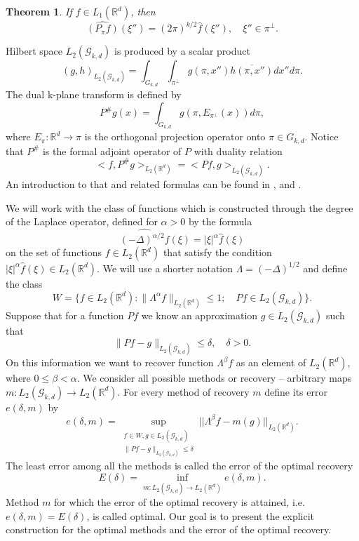 \documentclass[12pt]{iopart}
\newtheorem{theorem}{Theorem}
\begin{document}
	\begin{theorem}
		\label{projection}
		If $f\in L_1(\mathbb R^d)$, then
		$$\widehat{(P_\pi f)}(\xi'')=(2\pi)^{k/2}\widehat f(\xi''),\quad \xi''\in\pi^\perp.$$
	\end{theorem}
	Hilbert space $L_2(\mathcal G_{k,d})$ is produced by a scalar product	
	$$(g,h)_{L_2(\mathcal G_{k,d})}=\int_{G_{k,d}}\int_{\pi^\perp}g(\pi,x'')\overline{h(\pi,x'')}dx''d\pi.$$
	The dual k-plane transform is defined by
	$$P^\#g(x) = \int_{G_{k,d}}g(\pi,E_{\pi^\perp}(x))d\pi,$$
	where $E_\pi:\mathbb R^d\rightarrow\pi$ is the orthogonal projection operator onto $\pi\in G_{k,d}$.
	Notice that $P^\#$ is the formal adjoint operator of $P$ with duality relation
	\begin{equation}
	\label{duality}
	<f,P^\#g>_{L_2(\mathbb R^d)} = <Pf,g>_{L_2(\mathcal G_{k,d})}.
	\end{equation}
	An introduction to that and related formulas can be found in \cite{H},\cite{K} and \cite{MA}.
	
	We will work with the class of functions which is constructed through the degree of the Laplace operator, defined for $\alpha> 0$ by the formula 
	$$\widehat{(-\Delta)^{\alpha/2}f}(\xi)=|\xi|^\alpha \widehat f(\xi)$$ on the set of functions $f\in L_2(\mathbb R^d)$ that satisfy the condition $|\xi|^\alpha\widehat f(\xi)\in L_2(\mathbb R^d)$.
	We will use a shorter notation $\Lambda=(-\Delta)^{1/2}$ and define the class 
	$$ W=\{f\in L_2(\mathbb R^d) :
	\|\Lambda^\alpha f\|_{L_2(\mathbb R^d)}\leqslant  1;\quad Pf\in L_2(\mathcal G_{k,d}) \}.  $$
	Suppose that for a function $Pf$ we know an approximation $g\in L_2(\mathcal G_{k,d})$ such that
	$$\|Pf-g\|_{L_2(\mathcal G_{k,d})}\leqslant\delta, \quad\delta>0.$$
	On this information we want to recover function $\Lambda^\beta f$ as an element of $ L_2(\mathbb R^d)$, where $0\leqslant\beta<\alpha$. We consider all possible methods or recovery -- arbitrary maps $m:L_2(\mathcal G_{k,d})\rightarrow L_2(\mathbb R^d)$. For every method of recovery $m$ define its error $e(\delta,m)$ by
	\[
	e(\delta,m)=\sup_{
		\begin{smallmatrix}
		f\in W, g\in L_2(\mathcal G_{k,d})\\ 
		\|Pf-g\|_{L_2(\mathcal G_{k,d})}\leqslant \delta
		\end{smallmatrix}} ||\Lambda^\beta f-m(g)||_{L_2(\mathbb R^d)}.
	\] 
	The least error among all the methods is called the error of the optimal recovery
	\begin{equation}
	\label{opter}
	E(\delta)=\inf_{m:L_2(\mathcal G_{k,d})\rightarrow L_2(\mathbb R^d)}e(\delta,m).
	\end{equation}
	Method $m$ for which the error of the optimal recovery is attained, i.e. $e(\delta,m)=E(\delta)$, is called optimal. Our goal is to present the explicit construction for the optimal methods and the error of the optimal recovery.
	
\end{document}
